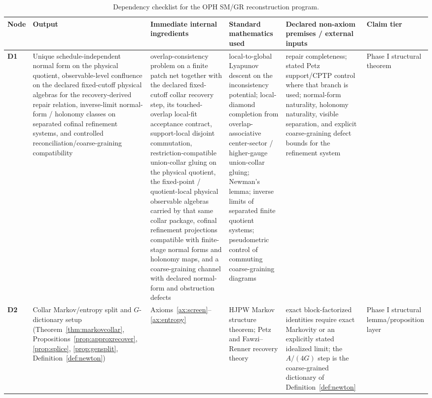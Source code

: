 \documentclass[11pt]{article}
\begin{document}
\begingroup
\tiny
\setlength{\tabcolsep}{1pt}
\begin{longtable}{@{}>{\raggedright\arraybackslash}p{}>{\raggedright\arraybackslash}p{}>{\raggedright\arraybackslash}p{}>{\raggedright\arraybackslash}p{}>{\raggedright\arraybackslash}p{}>{\raggedright\arraybackslash}p{}@{}}
\caption{Dependency checklist for the OPH SM/GR reconstruction program.}\\
\toprule
Node & Output & Immediate internal ingredients & Standard mathematics used & Declared non-axiom premises / external inputs & Claim tier \\
\midrule
\endhead
\bottomrule
\endfoot
\textbf{D1} & Unique schedule-independent normal form on the physical quotient, observable-level confluence on the declared fixed-cutoff physical algebras for the recovery-derived repair relation, inverse-limit normal-form / holonomy classes on separated cofinal refinement systems, and controlled reconciliation/coarse-graining compatibility & overlap-consistency problem on a finite patch net together with the declared fixed-cutoff collar recovery step, its touched-overlap local-fit acceptance contract, support-local disjoint commutation, restriction-compatible union-collar gluing on the physical quotient, the fixed-point / quotient-local physical observable algebras carried by that same collar package, cofinal refinement projections compatible with finite-stage normal forms and holonomy maps, and a coarse-graining channel with declared normal-form and obstruction defects & local-to-global Lyapunov descent on the inconsistency potential; local-diamond completion from overlap-associative center-sector / higher-gauge union-collar gluing; Newman's lemma; inverse limits of separated finite quotient systems; pseudometric control of commuting coarse-graining diagrams & repair completeness; stated Petz support/CPTP control where that branch is used; normal-form naturality, holonomy naturality, visible separation, and explicit coarse-graining defect bounds for the refinement system & Phase I structural theorem \\
\textbf{D2} & Collar Markov/entropy split and \(G\)-dictionary setup (Theorem~\ref{thm:markovcollar}, Propositions~\ref{prop:approxrecover}, \ref{prop:splice}, \ref{prop:gensplit}, Definition~\ref{def:newton}) & Axioms~\ref{ax:screen}--\ref{ax:entropy} & HJPW Markov structure theorem; Petz and Fawzi--Renner recovery theory & exact block-factorized identities require exact Markovity or an explicitly stated idealized limit; the \(A/(4G)\) step is the coarse-grained dictionary of Definition~\ref{def:newton} & Phase I structural lemma/proposition layer \\

\end{longtable}
\end{document}
